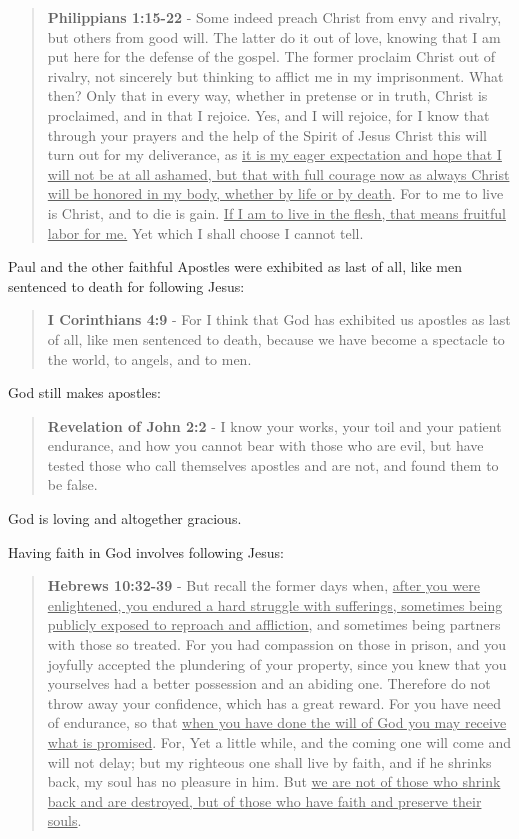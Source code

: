 \documentclass[11pt]{article}
\begin{document}
\begin{quote}
\textbf{Philippians 1:15-22} - Some indeed preach Christ from envy and rivalry, but others from good will. The latter do it out of love, knowing that I am put here for the defense of the gospel. The former proclaim Christ out of rivalry, not sincerely but thinking to afflict me in my imprisonment. What then? Only that in every way, whether in pretense or in truth, Christ is proclaimed, and in that I rejoice. Yes, and I will rejoice, for I know that through your prayers and the help of the Spirit of Jesus Christ this will turn out for my deliverance, as \uline{it is my eager expectation and hope that I will not be at all ashamed, but that with full courage now as always Christ will be honored in my body, whether by life or by death}. For to me to live is Christ, and to die is gain. \uline{If I am to live in the flesh, that means fruitful labor for me.} Yet which I shall choose I cannot tell.
\end{quote}

Paul and the other faithful Apostles were exhibited as last of all, like men sentenced to death for following Jesus:

\begin{quote}
\textbf{I Corinthians 4:9} - For I think that God has exhibited us apostles as last of all, like men sentenced to death, because we have become a spectacle to the world, to angels, and to men.
\end{quote}

God still makes apostles:

\begin{quote}
\textbf{Revelation of John 2:2} - I know your works, your toil and your patient endurance, and how you cannot bear with those who are evil, but have tested those who call themselves apostles and are not, and found them to be false.
\end{quote}

God is loving and altogether gracious.

Having faith in God involves following Jesus:

\begin{quote}
\textbf{Hebrews 10:32-39} - But recall the former days when, \uline{after you were enlightened, you endured a hard struggle with sufferings, sometimes being publicly exposed to reproach and affliction}, and sometimes being partners with those so treated. For you had compassion on those in prison, and you joyfully accepted the plundering of your property, since you knew that you yourselves had a better possession and an abiding one. Therefore do not throw away your confidence, which has a great reward. For you have need of endurance, so that \uline{when you have done the will of God you may receive what is promised}. For, Yet a little while, and the coming one will come and will not delay; but my righteous one shall live by faith, and if he shrinks back, my soul has no pleasure in him. But \uline{we are not of those who shrink back and are destroyed, but of those who have faith and preserve their souls}.
\end{quote}
\end{document}

